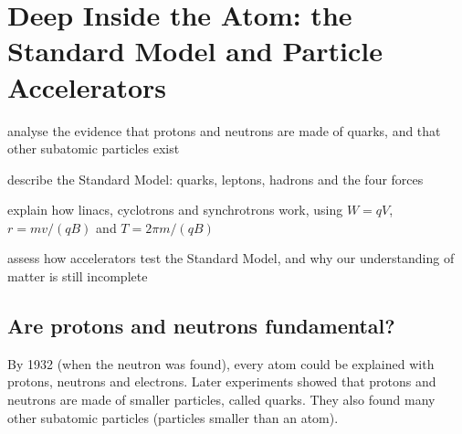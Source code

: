 \chapter[Deep Inside the Atom]{Deep Inside the Atom: the Standard Model and Particle Accelerators}\label{ch5:chap}

\newcommand\chFiveaq[1]{\ensuremath{\overline{\mathrm{#1}}}} %
\newcommand\chFiveperc{\ensuremath{/c^2}}                     %
\newcommand\chFiveanu{\ensuremath{\overline{\nu}_\mathrm{e}}} %


\begin{goals}
  \item analyse the evidence that protons and neutrons are made of quarks, and that
        other subatomic particles exist
  \item describe the Standard Model: quarks, leptons, hadrons and the four forces
  \item explain how linacs, cyclotrons and synchrotrons work, using $W = qV$,
        $r = mv/(qB)$ and $T = 2\pi m/(qB)$
  \item assess how accelerators test the Standard Model, and why our understanding of
        matter is still incomplete
\end{goals}

\section{Are protons and neutrons fundamental?}\label{ch5:sec:evidence}

\begin{bigidea}
By 1932 (when the neutron was found), every atom could be explained with protons, neutrons
and electrons. Later experiments showed that protons and neutrons are made of smaller
particles, called quarks. They also found many other subatomic particles (particles
smaller than an atom).
\end{bigidea}

\begin{keywords}
\end{keywords}

